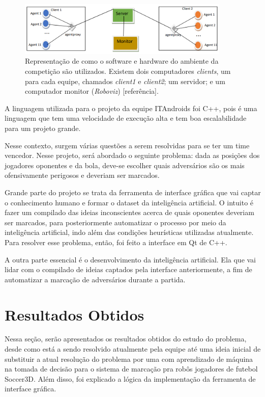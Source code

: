 \documentclass[a4paper,12pt]{article}
\begin{document}
\begin{figure}[H]
	\centering
	\includegraphics[width=0.9\textwidth]{figures/computers-schema.png}
   \caption{Representação de como o software e hardware do ambiente da competição são utilizados. Existem dois computadores \textit{clients}, um para cada equipe, chamados \textit{client1} e \textit{client2}; um servidor; e um computador monitor (\textit{Roboviz}) [referência].} \label{fig:computers-schema}
\end{figure}

A linguagem utilizada para o projeto da equipe ITAndroids foi C++, pois é uma linguagem que tem uma velocidade de execução alta e tem boa escalabilidade para um projeto grande.

Nesse contexto, surgem várias questões a serem resolvidas para se ter um time vencedor. Nesse projeto, será abordado o seguinte problema: dada as posições dos jogadores oponentes e da bola, deve-se escolher quais adversários são os mais ofensivamente perigosos e deveriam ser marcados.

Grande parte do projeto se trata da ferramenta de interface gráfica que vai captar o conhecimento humano e formar o dataset da inteligência artificial. O intuito é fazer um compilado das ideias inconscientes acerca de quais oponentes deveriam ser marcados, para posteriormente automatizar o processo por meio da inteligência artificial, indo além das condições heurísticas utilizadas atualmente. Para resolver esse problema, então, foi feito a interface em Qt de C++.

A outra parte essencial é o desenvolvimento da inteligência artificial. Ela que vai lidar com o compilado de ideias captados pela interface anteriormente, a fim de automatizar a marcação de adversários durante a partida.

\section{Resultados Obtidos}

Nessa seção, serão apresentados os resultados obtidos do estudo do problema, desde como está a sendo resolvido atualmente pela equipe até uma ideia inicial de substituir a atual resolução do problema por uma com aprendizado de máquina na tomada de decisão para o sistema de marcação pra robôs jogadores de futebol Soccer3D. Além disso, foi explicado a lógica da implementação da ferramenta de interface gráfica.
\end{document}
